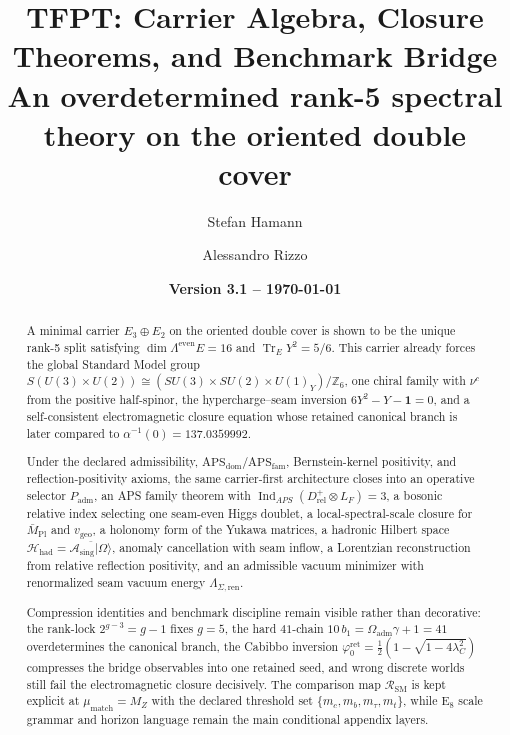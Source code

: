 \documentclass[11pt,a4paper]{article}
\title{%
    \textbf{TFPT: Carrier Algebra, Closure Theorems, and Benchmark Bridge}\\[0.5em]
    \Large An overdetermined rank-5 spectral theory on the oriented double cover
}
\author{Stefan Hamann \and Alessandro Rizzo}
\date{\textbf{Version 3.1 -- \today}}
\theoremstyle{definition}
\theoremstyle{remark}
\DeclareMathOperator{\tr}{Tr}
\DeclareMathOperator{\Ind}{Ind}
\newcommand{\Seam}{\Sigma}
\newcommand{\Mpl}{\bar M_{\mathrm{Pl}}}
\newcommand{\phiz}{\varphi_0^{\mathrm{ret}}}
\newcommand{\SM}{\mathrm{SM}}
\newcommand{\Asing}{\mathcal A_{\mathrm{sing}}}
\newcommand{\Hhad}{\mathcal H_{\mathrm{had}}}
\newcommand{\APSdom}{\mathrm{APS}_{\mathrm{dom}}}
\newcommand{\APSfam}{\mathrm{APS}_{\mathrm{fam}}}
\newcommand{\vgeo}{v_{\mathrm{geo}}}
\newcommand{\Padm}{P_{\mathrm{adm}}}
\begin{document}
\maketitle

\begin{abstract}
A minimal carrier $E_3\oplus E_2$ on the oriented double cover is shown to be the unique rank-5 split satisfying $\dim\Lambda^{\mathrm{even}}E=16$ and $\tr_EY^2=5/6$. This carrier already forces the global Standard Model group $S(U(3)\times U(2))\cong(SU(3)\times SU(2)\times U(1)_Y)/\mathbb Z_6$, one chiral family with $\nu^c$ from the positive half-spinor, the hypercharge--seam inversion $6Y^2-Y-\mathbf 1=0$, and a self-consistent electromagnetic closure equation whose retained canonical branch is later compared to $\alpha^{-1}(0)=\num{137.0359992}$.

Under the declared admissibility, $\APSdom/\APSfam$, Bernstein-kernel positivity, and reflection-positivity axioms, the same carrier-first architecture closes into an operative selector $\Padm$, an APS family theorem with $\Ind_{APS}(D^+_{\mathrm{rel}}\otimes L_F)=3$, a bosonic relative index selecting one seam-even Higgs doublet, a local-spectral-scale closure for $\Mpl$ and $\vgeo$, a holonomy form of the Yukawa matrices, a hadronic Hilbert space $\Hhad=\overline{\Asing|\Omega\rangle}$, anomaly cancellation with seam inflow, a Lorentzian reconstruction from relative reflection positivity, and an admissible vacuum minimizer with renormalized seam vacuum energy $\Lambda_{\Seam,\mathrm{ren}}$.

Compression identities and benchmark discipline remain visible rather than decorative: the rank-lock $2^{g-3}=g-1$ fixes $g=5$, the hard $41$-chain $10\,b_1=\Omega_{\mathrm{adm}}\gamma+1=41$ overdetermines the canonical branch, the Cabibbo inversion $\phiz=\frac12(1-\sqrt{1-4\lambda_C^2})$ compresses the bridge observables into one retained seed, and wrong discrete worlds still fail the electromagnetic closure decisively. The comparison map $\mathcal R_{\SM}$ is kept explicit at $\mu_{\mathrm{match}}=M_Z$ with the declared threshold set $\{m_c,m_b,m_\tau,m_t\}$, while E$_8$ scale grammar and horizon language remain the main conditional appendix layers.
\end{abstract}
\end{document}
